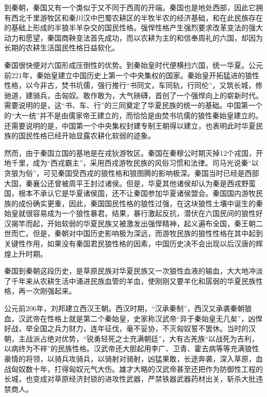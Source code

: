 \par 到秦朝，秦国又有一个类似于又不同于西周的开端。秦国也是地处西部，因此它拥有西北千里游牧区和秦川汉中巴蜀农耕区的半牧半农的经济基础，和在此民族存在的基础上形成的半狼半羊杂交的国民性格。强悍性格产生强烈要求改革变法的强大动力和愿望，秦国商鞅变法首先成功，而以农耕为主的和信奉周礼的六国，却因为长期的农耕生活国民性格日益软化。
\par 秦国很快便对六国形成压倒性的优势。到秦始皇时代便横扫六国，统一华夏。公元前221年，秦始皇建立中国历史上第一个中央集权的国家。秦始皇开拓猛进的狼性性格，以今非古，焚书坑儒，强行推行“书同文，车同轨，行同伦”，又筑长城，修驰道，建骑兵，击匈奴。敢作敢为，大气磅礴，首创了一个强悍向上的崭新时代。需要说明的是，这“书、车、行”的三同奠定了华夏民族的统一的基础。中国第一个的“大一统”并不是由儒家帝王建立的，而恰恰是由焚书坑儒的狼性秦始皇建立的。还需要说明的是，中国第一个中央集权封建专制王朝得以建立，也表明此时华夏民族的国民性格已经开始显露农耕化软弱的迹象。
\par 然而，由于秦国立国的基地是在戎狄游牧区。秦国在秦穆公时期灭掉12个戎国，开地千里，成为“西戎霸主”，采用西戎游牧民族的风俗习惯和法律。司马光说秦“以贪狼为俗”，可见秦国受西戎的狼性格和狼图腾的影响极深。秦国当时已经是西部大国，秦襄公还曾被周平王封过诸侯。但是，华夏其他诸侯却认为秦是西戎野蛮国，根本不承认它是华夏诸侯国，还不让秦国参加华夏诸侯盟会。秦国国内游牧民族的成份确实更重，因此，秦国国民性格的狼性过强，在这块狼性土壤中诞生的秦始皇就很容易成为一个狼性暴君。结果，暴行激起反抗，潜伏在六国民间的狼性好汉揭竿而起，开始软弱的华夏民族又被激发出强悍精神，起义遍布全国，秦王朝二世而亡。但是，秦朝对中国历史影响极为深远，而游牧民族的狼性性格在其中起到关键性作用，如果没有秦国君民狼性格的因素，中国历史决不会出现以后汉唐的辉煌上升时期。
\par 秦国到秦朝这段历史，是草原民族对华夏民族又一次狼性血液的输血，大大地冲淡了千年来从农耕生活中涌进民族血管的羊血，使刚刚又要羊化和孱弱的华夏民族性格，再一次刚强起来。
\par 公元前206年，刘邦建立西汉王朝。西汉时期，“汉承秦制”，西汉又承袭秦朝狼血，汉武帝在性格上就是第二个秦始皇，史家称汉武帝“异于秦始皇无几矣”，凶悍好战，举全国之兵力财力，连年征伐，毫不妥协，不灭匈奴誓不罢休。当时的汉朝，主战派占绝对优势，“锐勇轻死之士充满朝廷”，大有古羌族“以战死为吉利，以病终为不祥”的民族性格。汉武帝还大胆起用李广、卫青、霍去病等等充满狼性豪情的将领，以骑兵攻骑兵，以骑射对骑射，凶猛果敢，长途奔袭，深入草原，血战匈奴数十年，打得匈奴元气大伤。雄才大略的汉武帝甚至还把作为防御性工程的长城，也变成对草原经济封锁的进攻性武器，严禁铁器武器药材出关，斩杀大批违禁商人。
